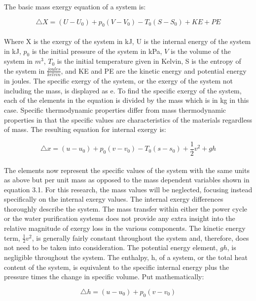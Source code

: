 The basic mass exergy equation of a system is\cite{moran2010fundamentals}:

\begin{equation}
\triangle X=(U-U_0)+p_0(V-V_0)-T_0(S-S_0)+KE+PE
\end{equation}
\\
Where X is the exergy of the system in kJ, U is the internal energy of the system in kJ, $p_0$ is the initial pressure of the system in kPa, $V$ is the volume of the system in $m^3$, $T_0$ is the initial temperature given in Kelvin, S is the entropy of the system in $\frac{joules}{kelvin}$, and KE and PE are the kinetic energy and potential energy in joules. The specific exergy of the system, or the exergy of the system not including the mass, is displayed as e.  To find the specific exergy of the system, each of the elements in the equation is divided by the mass which is in kg in this case. Specific thermodynamic properties differ from mass thermodynamic properties in that the specific values are characteristics of the materials regardless of mass. The resulting equation for internal exergy is:

\begin{equation}
\label{specificX}
\triangle x=(u-u_0)+p_0(v-v_0)-T_0(s-s_0)+\frac{1}{2}v^2+gh
\end{equation}
\\

The elements now represent the specific values of the system with the same units as above but per unit mass as opposed to the mass dependent variables shown in equation 3.1.  For this research, the mass values will be neglected, focusing instead specifically on the internal exergy values. The internal exergy differences thoroughly describe the system.  The mass transfer within either the power cycle or the water purification systems does not provide any extra insight into the relative magnitude of exergy loss in the various components. The kinetic energy term, $\frac{1}{2}v^2$, is generally fairly constant throughout the system and, therefore, does not need to be taken into consideration.  The potential energy element, $gh$, is negligible throughout the system. The enthalpy, h, of a system, or the total heat content of the system, is equivalent to the specific internal energy plus the pressure times the change in specific volume.  Put mathematically:

\begin{equation}
\triangle h=(u-u_0)+p_0(v-v_0)
\end{equation}

